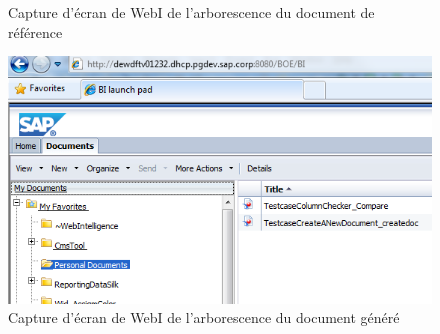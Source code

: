\begin{description}
\begin{figure}[H]
  \caption{Capture d'\'{e}cran de WebI de l'arborescence du document de r\'{e}f\'{e}rence}
	\label{figure:savedReferenceDocPath}
\end{figure}
\begin{figure}[H]
  \centering
      \includegraphics{images/savedGeneratedDocPath.png}
  \caption{Capture d'\'{e}cran de WebI de l'arborescence du document g\'{e}n\'{e}r\'{e}}
	\label{figure:savedGeneratedDocPath}
\end{figure}



\end{description}
